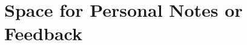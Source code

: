 \documentclass[a4paper,12pt,twoside]{memoir}
\begin{document}
%
%
\workshoptitlepage

%
%

\clearpage

\tableofcontents


%
%
%

%
%
%

%

%
%


%
%

\chapter{Space for Personal Notes or Feedback}
\clearpage

%
%
\myruledpage{0cm}{1cm}
\myruledpage{0cm}{1cm}
\myruledpage{0cm}{1cm}
\myruledpage{0cm}{1cm}
\end{document}
